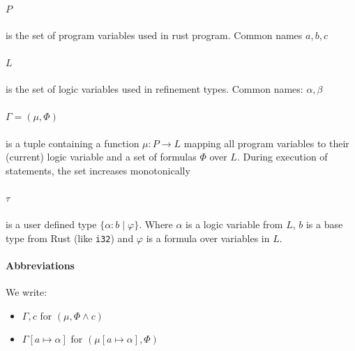 \documentclass{book}
\theoremstyle{definition}
\begin{document}
\paragraph*{$P$} is the set of program variables used in rust program. Common names $a, b, c$
\paragraph*{$L$} is the set of logic variables used in refinement types. Common names: $\alpha, \beta$

\paragraph*{$\Gamma = (\mu, \Phi)$} is a tuple containing a function $\mu: P \to L$ mapping all program variables to their (current) logic variable and a set of formulas $\Phi$ over $L$. During execution of statements, the set increases monotonically

\paragraph*{$\tau$} is a user defined type $\{ \alpha : b \mid \varphi\}$. Where $\alpha$ is a logic variable from $L$, $b$ is a base type from Rust (like \texttt{i32}) and $\varphi$ is a formula over variables in $L$.

\paragraph*{Abbreviations}
We write:
\begin{itemize}
  \item  $\Gamma, c$ for $(\mu, \Phi \wedge c)$
  \item $\Gamma[a \mapsto \alpha]$ for $(\mu[a \mapsto \alpha], \Phi)$
\end{itemize}


\end{document}
